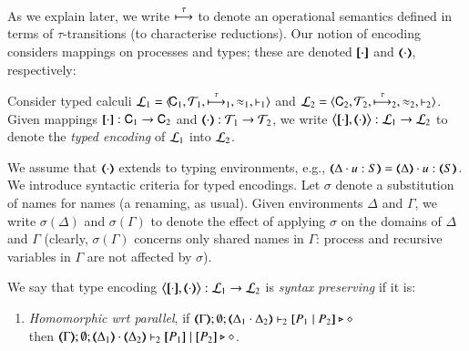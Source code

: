 \documentclass[runningheads]{llncs}
\begin{document}
{\smallskip 

\noi 
As we explain later, we write $\stackrel{\tau}{\longmapsto}$ to denote an operational semantics defined in terms of
$\tau$-transitions (to characterise reductions).
Our notion of encoding considers mappings on processes 
and types; these are denoted $[\!\![\cdot]\!\!]$ and $(\!\!\langle\cdot\rangle\!\!)$, respectively: %

\begin{definition}%
\label{def:tenc}
        Consider typed calculi
        $\mathcal{L}_1=\langle \!\mathsf{C}_1, {\cal{T}}_1, \stackrel{\tau}{\longmapsto}_1, \approx_1, \vdash_1 \rangle$
        and
        $\mathcal{L}_2=\langle \mathsf{C}_2, {\cal{T}}_2, \stackrel{\tau}{\longmapsto}_2, \approx_2, \vdash_2 \rangle$.
	Given mappings $[\!\![\cdot]\!\!]: \mathsf{C}_1 \to \mathsf{C}_2$ and
	$(\!\!\langle\cdot\rangle\!\!): {\cal{T}}_1 \to {\cal{T}}_2$, 
	we write 
		$\enco{\map{\cdot}, \mapt{\cdot}} : 
	\tyl{L}_1 \to \tyl{L}_2$ to denote the \emph{typed encoding} of $\mathcal{L}_1$ into $\mathcal{L}_2$.
\end{definition}

\smallskip 

\noi We  assume that $(\!\!\langle\cdot\rangle\!\!)$ extends to typing
environments, e.g., $\mapt{\Delta \cat u:S} = \mapt{\Delta} \cat u:\mapt{S}$.
We introduce syntactic criteria for typed encodings.
Let $\sigma$ denote a substitution of names for names (a renaming, as usual). Given environments $\Delta$ and $\Gamma$,
we write $\sigma(\Delta)$ and $\sigma(\Gamma)$ to denote the effect of applying $\sigma$ on the 
domains of $\Delta$ and $\Gamma$
(clearly, $\sigma(\Gamma)$ concerns only shared names in $\Gamma$: process and recursive variables in $\Gamma$ are not affected by $\sigma$). 

\smallskip 

\begin{definition}%
	\label{def:sep}
	We say that 
	type encoding 
	$\enco{\map{\cdot}, \mapt{\cdot}}: \tyl{L}_1 \to \tyl{L}_2$ is \emph{syntax preserving}
	if it is:
	
	\begin{enumerate}[1.]
		\item	\emph{Homomorphic wrt parallel},   if 
		$\mapt{\Gamma}; \emptyset; \mapt{\Delta_1 \cat \Delta_2} \proves_2 \map{P_1 \Par P_2} \hastype \Proc$ \\
		then 
		$\mapt{\Gamma}; \emptyset; \mapt{\Delta_1} \cat \mapt{\Delta_2} \proves_2 \map{P_1} \Par \map{P_2} \hastype \Proc$.


\end{enumerate}
\end{definition}}
\end{document}
